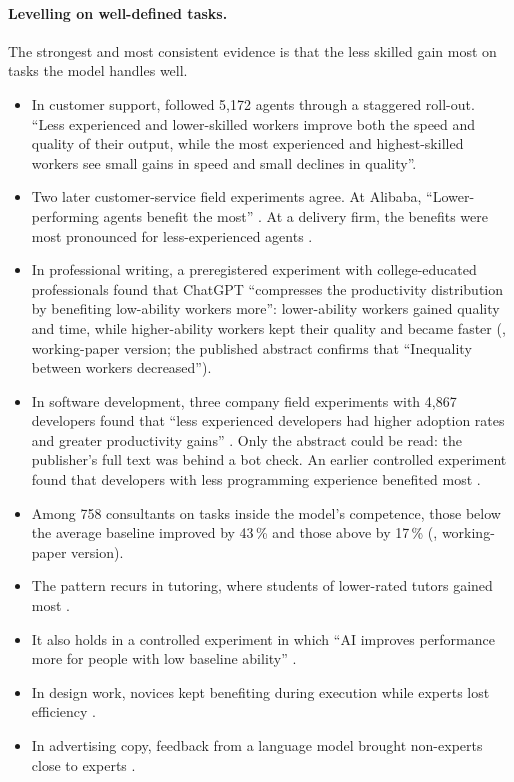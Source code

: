 \paragraph{Levelling on well-defined tasks.}
The strongest and most consistent evidence is that the less skilled gain
most on tasks the model handles well.
\begin{itemize}
\item In customer support, \textcite{Brynjolfsson2025Generative} followed
  5,172 agents through a staggered roll-out. \enquote{Less experienced
  and lower-skilled workers improve both the speed and quality of their
  output, while the most experienced and highest-skilled workers see
  small gains in speed and small declines in quality}.
\item Two later customer-service field experiments agree. At Alibaba,
  \enquote{Lower-performing agents benefit the most}
  \autocite{Ni2026Generative}. At a delivery firm, the benefits were most
  pronounced for less-experienced agents \autocite{Zhang2026Engaging}.
\item In professional writing, a preregistered experiment with
  college-educated professionals found that ChatGPT \enquote{compresses
  the productivity distribution by benefiting low-ability workers more}:
  lower-ability workers gained quality and time, while higher-ability
  workers kept their quality and became faster
  (\cite{Noy2023Experimental}, working-paper version; the published
  abstract confirms that \enquote{Inequality between workers
  decreased}).
\item In software development, three company field experiments with
  4,867 developers found that \enquote{less experienced developers had
  higher adoption rates and greater productivity gains}
  \autocite{Cui2026Effects}. Only the abstract could be read: the
  publisher's full text was behind a bot check. An earlier
  controlled experiment found that developers with less programming
  experience benefited most \autocite{Peng2023Impact}.
\item Among 758 consultants on tasks inside the model's competence,
  those below the average baseline improved by 43\,\% and those above by
  17\,\% (\cite{DellAcqua2026Navigating}, working-paper version).
\item The pattern recurs in tutoring, where students of lower-rated
  tutors gained most \autocite{Wang2024Tutor}.
\item It also holds in a controlled experiment in which \enquote{AI
  improves performance more for people with low baseline ability}
  \autocite{Caplin2026ABCs}.
\item In design work, novices kept benefiting during execution while
  experts lost efficiency \autocite{Hou2025DoubleEdged}.
\item In advertising copy, feedback from a language model brought
  non-experts close to experts \autocite{Chen2024Large}.
\end{itemize}
